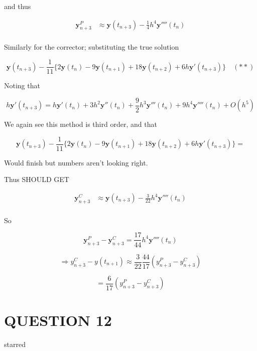 \documentclass[a4paper]{article}
\begin{document}
and thus

\begin{align*}
\mathbf{y}_{n+3}^{P} & \approx \mathbf{y}(t_{n+3}) - \frac{1}{4} h^{4} \mathbf{y}''''(t_{n}) \\
\end{align*}

Similarly for the corrector; substituting the true solution

\[ \mathbf{y}(t_{n+3}) - \frac{1}{11} \{ 2 \mathbf{y}(t_{n}) - 9 \mathbf{y}(t_{n+1})  + 18 \mathbf{y}(t_{n+2}) + 6h\mathbf{y}'(t_{n+3})  \} \quad (**) \]

Noting that

\[ h\mathbf{y}'(t_{n+3}) = h \mathbf{y}'(t_{n}) + 3h^{2} \mathbf{y}''(t_{n}) + \frac{9}{2} h^{3} \mathbf{y}'''(t_{n}) + 9 h^{4}  \mathbf{y}''''(t_{n}) + O(h^{5}) \]

We again see this method is third order, and that 

\[ \mathbf{y}(t_{n+3}) - \frac{1}{11} \{ 2 \mathbf{y}(t_{n}) - 9 \mathbf{y}(t_{n+1})  + 18 \mathbf{y}(t_{n+2}) + 6h\mathbf{y}'(t_{n+3})  \} =  \]

Would finish but numbers aren't looking right.

Thus SHOULD GET

\begin{align*}
\mathbf{y}_{n+3}^{C} & \approx \mathbf{y}(t_{n+3}) - \frac{3}{22} h^{4} \mathbf{y}''''(t_{n}) \\
\end{align*}

So 

\[ \mathbf{y}_{n+3}^{P} - \mathbf{y}_{n+3}^{C} =  \frac{17}{44} h^{4} \mathbf{y}''''(t_{n}) \]

\[ \Rightarrow y_{n+3}^{C} - y(t_{n+1}) \approx \frac{3}{22} \frac{44}{17} (y_{n+3}^{P} - y_{n+3}^{C}) \]

\[ = \frac{6}{17}  \left( y_{n+3}^{P} - y_{n+3}^{C} \right)  \]



\section{QUESTION 12}

starred
\end{document}
